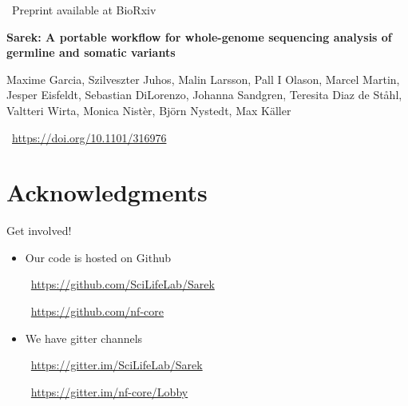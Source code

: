 \documentclass[usepdftitle=false]{beamer}
\begin{document}
\begin{frame}{\faWrench\ Preprint available at BioRxiv}

	\textbf{Sarek: A portable workflow for whole-genome sequencing analysis of germline and somatic variants}

	\small{Maxime Garcia,
	Szilveszter Juhos,
	Malin Larsson,
	Pall I Olason,
	Marcel Martin,
	Jesper Eisfeldt,
	Sebastian DiLorenzo,
	Johanna Sandgren,
	Teresita Diaz de Ståhl,
	Valtteri Wirta,
	Monica Nistèr,
	Björn Nystedt,
	Max Käller}

	\aiDoi\ \url{https://doi.org/10.1101/316976}
\end{frame}

\section{Acknowledgments}

\begin{frame}{Get involved!}
	\begin{itemize}
		\item Our code is hosted on Github

		\faGithub\ \url{https://github.com/SciLifeLab/Sarek}

		\faGithub\ \url{https://github.com/nf-core}
	\end{itemize}
	\pause
	\begin{itemize}
		\item We have gitter channels

		\faGitter\ \url{https://gitter.im/SciLifeLab/Sarek}

		\faGitter\ \url{https://gitter.im/nf-core/Lobby}
	\end{itemize}
\end{frame}
\end{document}
